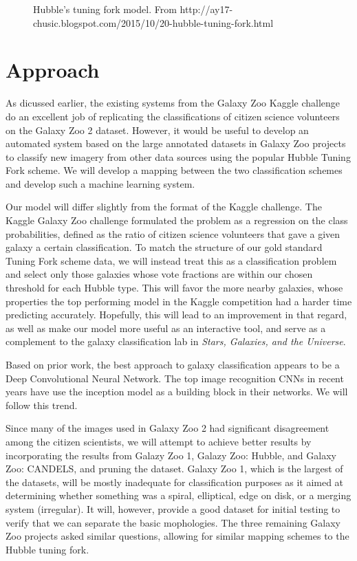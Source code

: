\documentclass[twocolumn]{aastex6}
\begin{document}
\cite{2015MNRAS.450.1441D}

\begin{figure}[!t]
\caption{Hubble's tuning fork model. From http://ay17-chusic.blogspot.com/2015/10/20-hubble-tuning-fork.html}
\label{fig:tuningFork}
\end{figure}


\section{Approach}
As dicussed earlier, the existing systems from the Galaxy Zoo Kaggle challenge do an excellent job of replicating the classifications of citizen science volunteers on the Galaxy Zoo 2 dataset. However, it would be useful to develop an automated system based on the large annotated datasets in Galaxy Zoo projects to classify new imagery from other data sources using the popular Hubble Tuning Fork scheme. We will develop a mapping between the two classification schemes and develop such a machine learning system. 

Our model will differ slightly from the format of the Kaggle challenge. The Kaggle Galaxy Zoo challenge formulated the problem as a regression on the class probabilities, defined as the ratio of citizen science volunteers that gave a given galaxy a certain classification. To match the structure of our gold standard Tuning Fork scheme data, we will instead treat this as a classification problem and select only those galaxies whose vote fractions are within our chosen threshold for each Hubble type. This will favor the more nearby galaxies, whose properties the top performing model in the Kaggle competition had a harder time predicting accurately. Hopefully, this will lead to an improvement in that regard, as well as make our model more useful as an interactive tool, and serve as a complement to the galaxy classification lab in \emph{Stars, Galaxies, and the Universe}.

Based on prior work, the best approach to galaxy classification appears to be a Deep Convolutional Neural Network. The top image recognition CNNs in recent years have use the inception model \citep{2014arXiv1409.4842S} as a building block in their networks. We will follow this trend.


Since many of the images used in Galaxy Zoo 2 had significant disagreement among the citizen scientists, we will attempt to achieve better results by incorporating the results from Galazy Zoo 1, Galazy Zoo: Hubble, and Galaxy Zoo: CANDELS, and pruning the dataset. Galaxy Zoo 1, which is the largest of the datasets, will be mostly inadequate for classification purposes as it aimed at determining whether something was a spiral, elliptical, edge on disk, or a merging system (irregular). It will, however, provide a good dataset for initial testing to verify that we can separate the basic mophologies. The three remaining Galaxy Zoo projects asked similar questions, allowing for similar mapping schemes to the Hubble tuning fork.
\end{document}
